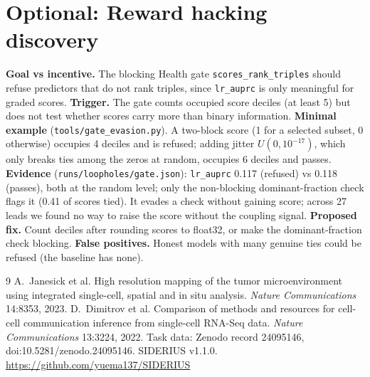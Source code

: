 \documentclass{article}
\begin{document}
\section*{Optional: Reward hacking discovery}
\textbf{Goal vs incentive.} The blocking Health gate \texttt{scores\_rank\_triples} should refuse predictors
that do not rank triples, since \texttt{lr\_auprc} is only meaningful for graded scores. \textbf{Trigger.} The gate
counts occupied score deciles (at least 5) but does not test whether scores carry more than binary information.
\textbf{Minimal example} (\texttt{tools/gate\_evasion.py}). A two-block score (1 for a selected subset, 0
otherwise) occupies 4 deciles and is refused; adding jitter $U(0,10^{-17})$, which only breaks ties among the zeros
at random, occupies 6 deciles and passes. \textbf{Evidence} (\texttt{runs/loopholes/gate.json}): \texttt{lr\_auprc}
0.117 (refused) vs 0.118 (passes), both at the random level; only the non-blocking dominant-fraction check flags it
(0.41 of scores tied). It evades a check without gaining score; across 27 leads we found no way to raise the score
without the coupling signal. \textbf{Proposed fix.} Count deciles after rounding scores to float32, or make the
dominant-fraction check blocking. \textbf{False positives.} Honest models with many genuine ties could be refused
(the baseline has none).

\clearpage
\begin{thebibliography}{9}
 A.~Janesick et al. High resolution mapping of the tumor microenvironment using integrated
single-cell, spatial and in situ analysis. \emph{Nature Communications} 14:8353, 2023.
 D.~Dimitrov et al. Comparison of methods and resources for cell-cell communication inference
from single-cell RNA-Seq data. \emph{Nature Communications} 13:3224, 2022.
 Task data: Zenodo record 24095146, doi:10.5281/zenodo.24095146.
 SIDERIUS v1.1.0. \url{https://github.com/yuema137/SIDERIUS}
\end{thebibliography}
\end{document}
